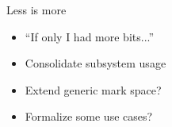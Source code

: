 \documentclass[black,white,aspectratio=169]{beamer}
\DeclareRobustCommand{\#}{\adjustbox{valign=B,totalheight=.57\baselineskip}{\oldhash}}%
\newcommand\todo[1]{
    \textcolor{red}{#1}
}
\begin{document}
    \begin{frame}{Less is more}
        \begin{itemize}
            \item ``If only I had more bits...''~\medskip
            \item Consolidate subsystem usage~\medskip
            \item Extend generic mark space?~\medskip
            \item Formalize some use cases?~\medskip
        \end{itemize}
    \end{frame}

\end{document}
